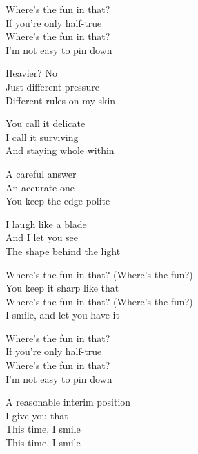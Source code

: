 \begin{lyrics}
Where’s the fun in that?\\
If you’re only half-true\\
Where’s the fun in that?\\
I’m not easy to pin down

Heavier? No\\
Just different pressure\\
Different rules on my skin

You call it delicate\\
I call it surviving\\
And staying whole within

A careful answer\\
An accurate one\\
You keep the edge polite

I laugh like a blade\\
And I let you see\\
The shape behind the light

Where’s the fun in that? (Where’s the fun?)\\
You keep it sharp like that\\
Where’s the fun in that? (Where’s the fun?)\\
I smile, and let you have it

Where’s the fun in that?\\
If you’re only half-true\\
Where’s the fun in that?\\
I’m not easy to pin down

A reasonable interim position\\
I give you that\\
This time, I smile\\
This time, I smile
\end{lyrics}

